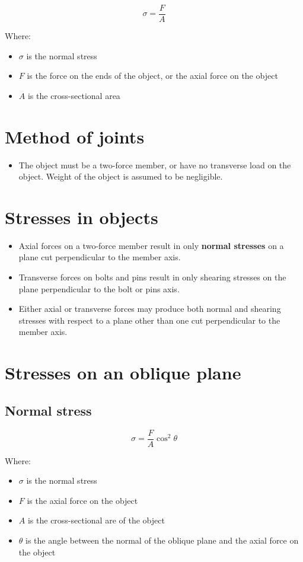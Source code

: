 \documentclass[11pt]{article}
\begin{document}
\[\sigma = \frac{F}{A}\]

Where:
\begin{itemize}
\item \(\sigma\) is the normal stress
\item \(F\) is the force on the ends of the object, or the axial force on the object
\item \(A\) is the cross-sectional area
\end{itemize}


\section{Method of joints}
\label{sec:org58991ba}
\begin{itemize}
\item The object must be a two-force member, or have no transverse load on the object. Weight of the object is assumed to be negligible.
\end{itemize}


\section{Stresses in objects}
\label{sec:org73e676b}
\begin{itemize}
\item Axial forces on a two-force member result in only \textbf{normal stresses} on a plane cut perpendicular to the member axis.
\item Transverse forces on bolts and pins result in only shearing stresses on the plane perpendicular to the bolt or pins axis.
\item Either axial or transverse forces may produce both normal and shearing stresses with respect to a plane other than one cut perpendicular to the member axis.
\end{itemize}


\section{Stresses on an oblique plane}
\label{sec:org0b0456d}

\subsection{Normal stress}
\label{sec:org21cf0b6}
\[\sigma = \frac{F}{A} \cos^2 \theta\]

Where:
\begin{itemize}
\item \(\sigma\) is the normal stress
\item \(F\) is the axial force on the object
\item \(A\) is the cross-sectional are of the object
\item \(\theta\) is the angle between the normal of the oblique plane and the axial force on the object
\end{itemize}
\end{document}
